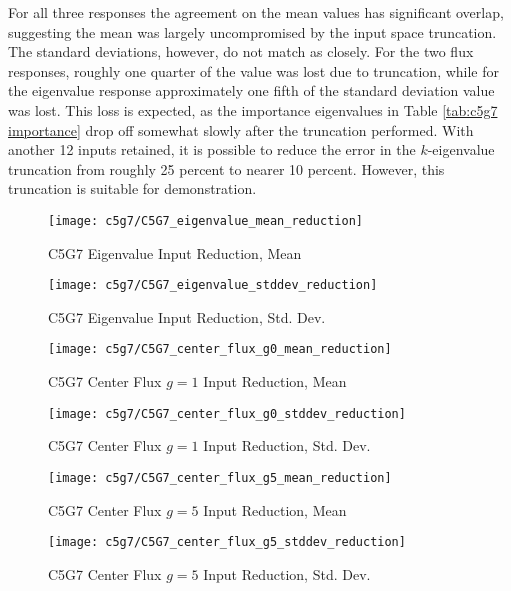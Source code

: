 For all three responses the agreement on the mean values has significant overlap, suggesting the mean was
largely uncompromised by the input space truncation.  The standard deviations, however, do not match as
closely.  For the two flux responses, roughly one quarter of the value was lost due to truncation, while for the
eigenvalue response approximately one fifth of the standard deviation value was lost.  This loss is expected,
as the importance eigenvalues in Table \ref{tab:c5g7 importance} drop off somewhat slowly after the truncation
performed.  With another 12 inputs retained, it is possible to reduce the error in the $k$-eigenvalue
truncation from roughly 25 percent to nearer 10 percent.  However, this truncation is suitable for
demonstration.
\begin{figure}[htb]
  \centering
  \texttt{[image: c5g7/C5G7\_eigenvalue\_mean\_reduction]}
  \caption{C5G7 Eigenvalue Input Reduction, Mean}
  \label{fig:c5g7 eigenvalue red mean}
\end{figure}
\begin{figure}[htb]
  \centering
  \texttt{[image: c5g7/C5G7\_eigenvalue\_stddev\_reduction]}
  \caption{C5G7 Eigenvalue Input Reduction, Std. Dev.}
  \label{fig:c5g7 eigenvalue red stdev}
\end{figure}
\begin{figure}[htb]
  \centering
  \texttt{[image: c5g7/C5G7\_center\_flux\_g0\_mean\_reduction]}
  \caption{C5G7 Center Flux $g=1$ Input Reduction, Mean}
  \label{fig:c5g7 center_flux_g0 red mean}
\end{figure}
\begin{figure}[htb]
  \centering
  \texttt{[image: c5g7/C5G7\_center\_flux\_g0\_stddev\_reduction]}
  \caption{C5G7 Center Flux $g=1$ Input Reduction, Std. Dev.}
  \label{fig:c5g7 center_flux_g0 red stdev}
\end{figure}
\begin{figure}[htb]
  \centering
  \texttt{[image: c5g7/C5G7\_center\_flux\_g5\_mean\_reduction]}
  \caption{C5G7 Center Flux $g=5$ Input Reduction, Mean}
  \label{fig:c5g7 center_flux_g5 red mean}
\end{figure}
\begin{figure}[htb]
  \centering
  \texttt{[image: c5g7/C5G7\_center\_flux\_g5\_stddev\_reduction]}
  \caption{C5G7 Center Flux $g=5$ Input Reduction, Std. Dev.}
  \label{fig:c5g7 center_flux_g5 red stdev}
\end{figure}

